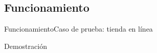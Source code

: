 %
%
%

\subsection{Funcionamiento}

\begin{frame}{Funcionamiento}{Caso de prueba: tienda en línea}

  \huge
  Demostración

\end{frame}
